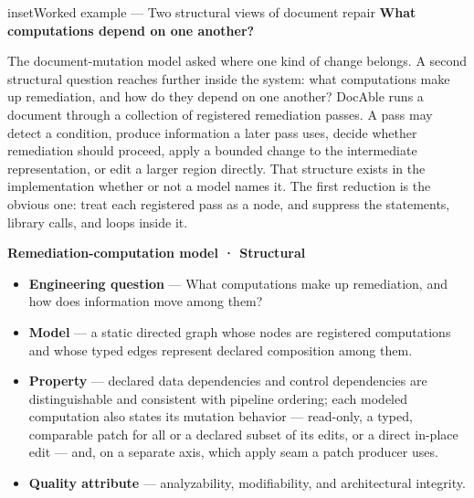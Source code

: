 \begin{bookbox}{inset}{Worked example --- Two structural views of document repair}
\textbf{What computations depend on one another?}


The document-mutation model asked where one kind of change belongs. A second structural question reaches further inside the system: what computations make up remediation, and how do they depend on one another? DocAble runs a document through a collection of registered remediation passes. A pass may detect a condition, produce information a later pass uses, decide whether remediation should proceed, apply a bounded change to the intermediate representation, or edit a larger region directly. That structure exists in the implementation whether or not a model names it. The first reduction is the obvious one: treat each registered pass as a node, and suppress the statements, library calls, and loops inside it.

\textbf{Remediation-computation model · Structural}

\begin{itemize}
\tightlist
\item
  \textbf{Engineering question} --- What computations make up remediation, and how does information move among them?
\end{itemize}

\begin{itemize}
\tightlist
\item
  \textbf{Model} --- a static directed graph whose nodes are registered computations and whose typed edges represent declared composition among them.
\end{itemize}

\begin{itemize}
\tightlist
\item
  \textbf{Property} --- declared data dependencies and control dependencies are distinguishable and consistent with pipeline ordering; each modeled computation also states its mutation behavior --- read-only, a typed, comparable patch for all or a declared subset of its edits, or a direct in-place edit --- and, on a separate axis, which apply seam a patch producer uses.
\end{itemize}

\begin{itemize}
\tightlist
\item
  \textbf{Quality attribute} --- analyzability, modifiability, and architectural integrity.
\end{itemize}


\end{bookbox}
